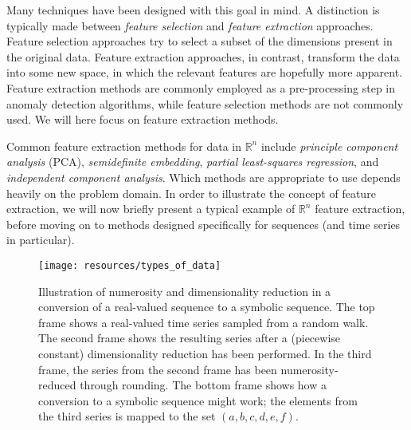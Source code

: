 Many techniques have been designed with this goal in mind. A distinction is typically made between \emph{feature selection} and \emph{feature extraction} approaches. Feature selection approaches try to select a subset of the dimensions present in the original data. Feature extraction approaches, in contrast, transform the data into some new space, in which the relevant features are hopefully more apparent. Feature extraction methods are commonly employed as a pre-processing step in anomaly detection algorithms, while feature selection methods are not commonly used. We will here focus on feature extraction methods.

Common feature extraction methods for data in $\mathbb{R}^n$ include \emph{principle component analysis} (PCA), \emph{semidefinite embedding}, \emph{partial least-squares regression}, and \emph{independent component analysis}. Which methods are appropriate to use depends heavily on the problem domain. In order to illustrate the concept of feature extraction, we will now briefly present a typical example of $\mathbb{R}^n$ feature extraction, before moving on to methods designed specifically for sequences (and time series in particular).


\begin{figure}[htb]
  \begin{center}
    \leavevmode
    \texttt{[image: resources/types\_of\_data]}
  \end{center}
  \caption{\small{Illustration of numerosity and dimensionality reduction in a conversion of a real-valued sequence to a symbolic sequence. The top frame shows a real-valued time series sampled from a random walk. The second frame shows the resulting series after a (piecewise constant) dimensionality reduction has been performed. In the third frame, the series from the second frame has been numerosity-reduced through rounding. The bottom frame shows how a conversion to a symbolic sequence might work; the elements from the third series is mapped to the set $(a,b,c,d,e,f)$.}}
\label{fig:types_of_data}
\end{figure}

